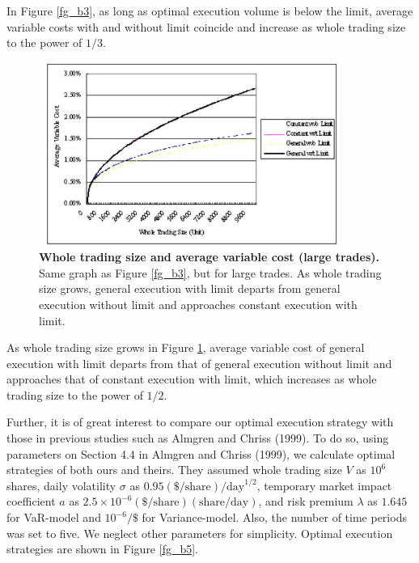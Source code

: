 \noindent In Figure \ref{fg_b3}, as long as optimal execution volume is below the limit, average variable costs with and without limit coincide and increase as whole trading size to the power of $1/3$.

\begin{figure}[htbp]
\begin{center}
 \includegraphics[width=10cm,height=6cm]{fg_b4n.png}
\end{center}
\caption[Whole trading size and average variable cost (large trades)]{{\bf Whole trading size and average variable
cost (large trades).}
 \quad Same graph as Figure \ref{fg_b3}, but for large trades.
 As whole trading size grows, general execution with limit departs from general execution without limit and
approaches constant execution with limit.}\label{fg_b4}
\end{figure}

\noindent As whole trading size grows in Figure \ref{fg_b4}, average variable cost of general execution with limit departs from that of general execution without limit and approaches that of constant execution with limit, which increases as whole trading size to the power of $1/2$.

Further, it is of great interest to compare our optimal execution strategy with those in previous studies such as Almgren and Chriss (1999).  To do so, using parameters on Section 4.4 in Almgren and Chriss (1999), we calculate optimal strategies of both ours and theirs.  They assumed whole trading size $V$ as $10^6$ shares, daily volatility $\sigma$ as $0.95(\$/\mbox{share})/\mbox{day}^{1/2}$, temporary market impact coefficient $a$ as $2.5 \times 10^{-6}(\$/\mbox{share})(\mbox{share}/\mbox{day})$, and risk premium $\lambda$ as $1.645$ for VaR-model and $10^{-6}/\$$ for Variance-model.  Also, the number of time periods was set to five.  We neglect other parameters for simplicity.  Optimal execution strategies are shown in Figure \ref{fg_b5}.  

